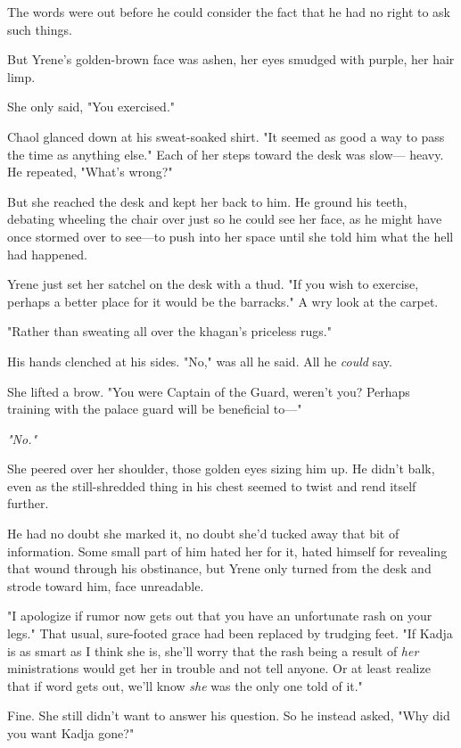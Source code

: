 The words were out before he could consider the fact that he had no right to ask such things.

But Yrene's golden-brown face was ashen, her eyes smudged with purple, her hair limp.

She only said, "You exercised."

Chaol glanced down at his sweat-soaked shirt. "It seemed as good a way to pass the time as anything else." Each of her steps toward the desk was slow--- heavy. He repeated, "What's wrong?"

But she reached the desk and kept her back to him. He ground his teeth, debating wheeling the chair over just so he could see her face, as he might have once stormed over to see---to push into her space until she told him what the hell had happened.

Yrene just set her satchel on the desk with a thud. "If you wish to exercise, perhaps a better place for it would be the barracks." A wry look at the carpet.

"Rather than sweating all over the khagan's priceless rugs."

His hands clenched at his sides. "No," was all he said. All he
\emph{could} say.

She lifted a brow. "You were Captain of the Guard, weren't you? Perhaps training with the palace guard will be beneficial to---"

\emph{"No."}

She peered over her shoulder, those golden eyes sizing him up. He didn't balk, even as the still-shredded thing in his chest seemed to twist and rend itself further.

He had no doubt she marked it, no doubt she'd tucked away that bit of information. Some small part of him hated her for it, hated himself for revealing that wound through his obstinance, but Yrene only turned from the desk and strode toward him, face unreadable.

"I apologize if rumor now gets out that you have an unfortunate rash on your legs." That usual, sure-footed grace had been replaced by trudging feet. "If Kadja is as smart as I think she is, she'll worry that the rash being a result of \emph{her} ministrations would get her in trouble and not tell anyone. Or at least realize that if word gets out, we'll know \emph{she} was the only one told of it."

Fine. She still didn't want to answer his question. So he instead asked, "Why did you want Kadja gone?"

